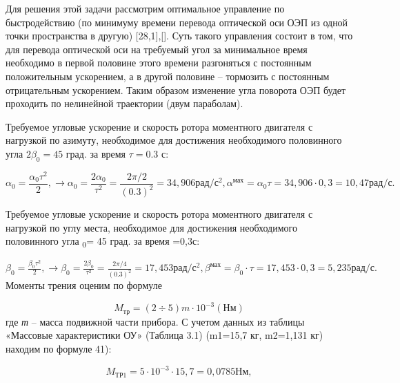 Для решения этой задачи рассмотрим оптимальное управление по быстродействию (по минимуму времени перевода оптической оси ОЭП из одной точки пространства в другую) [28,1],[]. Суть такого управления состоит в том, что для перевода оптической оси на требуемый угол за минимальное время необходимо в первой половине этого времени разгоняться с постоянным положительным ускорением, а в другой половине – тормозить с постоянным отрицательным ускорением. Таким образом изменение угла поворота ОЭП будет проходить по нелинейной траектории (двум параболам).\par

Требуемое угловые ускорение и скорость ротора моментного двигателя с нагрузкой по азимуту, необходимое для достижения необходимого половинного угла $2 \beta_0 = 45$ град. за время $\tau=0.3$ с:\par

\begin{Center}
	\[  \alpha _{0}=\frac{ \alpha _{0} \tau^{2}}{2}, \rightarrow  \alpha _{0}=\frac{2 \alpha _{0}}{ \tau^{2}}=\frac{2 \pi /2}{ \left( 0.3 \right) ^{2}}=34,906рад/с^{2}, \alpha ^{мах}= \alpha _{0} \tau=34,906⋅0,3=10,47рад/с. \] 
\end{Center}\par

Требуемое угловые ускорение и скорость ротора моментного двигателя с нагрузкой по углу места, необходимое для достижения необходимого половинного угла \textsubscript{0}= 45 град. за время =0,3с:\par

\begin{adjustwidth}{0.39in}{0.0in}
	\(  \beta _{0}=\frac{ \beta _{0} \tau^{2}}{2}, \rightarrow  \beta _{0}=\frac{2 \beta _{0}}{ \tau^{2}}=\frac{2 \pi /4}{ \left( 0.3 \right) ^{2}}=17,453рад/с^{2}, \beta ^{мах}= \beta _{0}⋅ \tau=17,453⋅0,3=5,235рад/с. \)  Моменты трения оценим по формуле \par
	
\end{adjustwidth}


\begin{equation}\tag{44}
M_{тр}= \left( 2  \div 5 \right) m⋅10^{-3} \left( Нм \right) 
\end{equation}
где \textit{т} – масса подвижной части прибора. С учетом данных из таблицы «Массовые характеристики ОУ» (Таблица 3.1) (m1=15,7 кг, m2=1,131 кг) находим по формуле 41):\par

\[ M_{ТР1}=5⋅10^{-3}⋅15,7=0,0785Нм, \] \par

